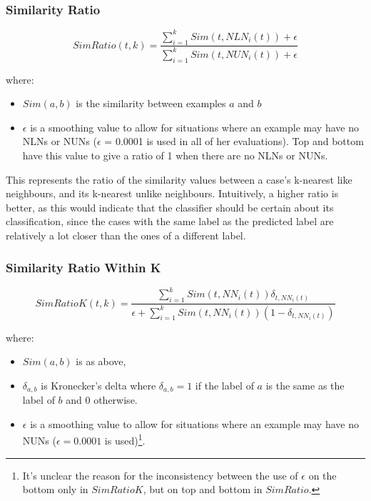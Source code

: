 \documentclass[a4paper,11pt]{report}
\begin{document}
\begin{samepage}

\subsubsection{Similarity Ratio}
\[
SimRatio(t,k)=\frac{\sum_{i=1}^{k}Sim(t,NLN_{i}(t))+\epsilon}{\sum_{i=1}^{k}Sim(t,NUN_{i}(t))+\epsilon}
\]

where:
\begin{itemize}
	\item $Sim(a, b)$ is the similarity between examples $a$ and $b$ 
	\item $\epsilon$ is a smoothing value to allow for situations where an example may have no NLNs or NUNs ($\epsilon$ = 0.0001 is used in all of her evaluations). Top and bottom have this value to give a ratio of 1 when there are no NLNs or NUNs.
\end{itemize}

This represents the ratio of the similarity values between a case's k-nearest like neighbours, and its k-nearest unlike neighbours. Intuitively, a higher ratio is better, as this would indicate that the classifier should be certain about its classification, since the cases with the same label as the predicted label are relatively a lot closer than the ones of a different label.

\end{samepage}

\subsubsection{Similarity Ratio Within K}
\[
SimRatioK(t,k)=\frac{\sum_{i=1}^{k}Sim(t,NN_{i}(t))\delta_{t,NN_{i}(t)}}{\epsilon+\sum_{i=1}^{k}Sim(t,NN_{i}(t))(1-\delta_{t,NN_{i}(t)})}
\]

where:
\begin{itemize}
	\item $Sim(a, b)$ is as above, 
	\item $\delta_{a, b}$ is Kronecker's delta where $\delta_{a, b}=1$ if the label of $a$ is the same as the label of $b$ and $0$ otherwise. 
	\item $\epsilon$ is a smoothing value to allow for situations where an example may have no NUNs ($\epsilon = 0.0001$ is used)\footnote{It's unclear the reason for the inconsistency between the use of $\epsilon$ on the bottom only in $SimRatioK$, but on top and bottom in $SimRatio$.}.
\end{itemize}
\end{document}
